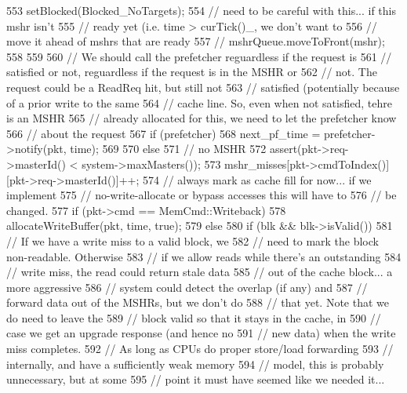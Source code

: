 \begin{DoxyCode}
{{{{553                 setBlocked(Blocked_NoTargets);
554                 // need to be careful with this... if this mshr isn't
555                 // ready yet (i.e. time > curTick()_, we don't want to
556                 // move it ahead of mshrs that are ready
557                 // mshrQueue.moveToFront(mshr);
558             }
559 
560             // We should call the prefetcher reguardless if the request is
561             // satisfied or not, reguardless if the request is in the MSHR or
562             // not.  The request could be a ReadReq hit, but still not
563             // satisfied (potentially because of a prior write to the same
564             // cache line.  So, even when not satisfied, tehre is an MSHR
565             // already allocated for this, we need to let the prefetcher know
566             // about the request
567             if (prefetcher) {
568                 next_pf_time = prefetcher->notify(pkt, time);
569             }
570         } else {
571             // no MSHR
572             assert(pkt->req->masterId() < system->maxMasters());
573             mshr_misses[pkt->cmdToIndex()][pkt->req->masterId()]++;
574             // always mark as cache fill for now... if we implement
575             // no-write-allocate or bypass accesses this will have to
576             // be changed.
577             if (pkt->cmd == MemCmd::Writeback) {
578                 allocateWriteBuffer(pkt, time, true);
579             } else {
580                 if (blk && blk->isValid()) {
581                     // If we have a write miss to a valid block, we
582                     // need to mark the block non-readable.  Otherwise
583                     // if we allow reads while there's an outstanding
584                     // write miss, the read could return stale data
585                     // out of the cache block... a more aggressive
586                     // system could detect the overlap (if any) and
587                     // forward data out of the MSHRs, but we don't do
588                     // that yet.  Note that we do need to leave the
589                     // block valid so that it stays in the cache, in
590                     // case we get an upgrade response (and hence no
591                     // new data) when the write miss completes.
592                     // As long as CPUs do proper store/load forwarding
593                     // internally, and have a sufficiently weak memory
594                     // model, this is probably unnecessary, but at some
595                     // point it must have seemed like we needed it...
}}}}}
\end{DoxyCode}
